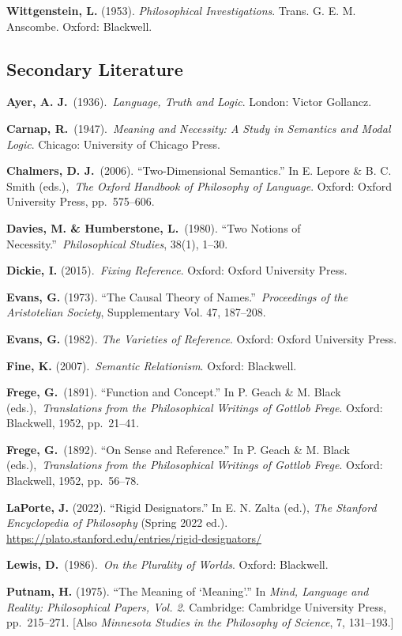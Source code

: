 \documentclass[12pt,a4paper]{article}
\begin{document}
\textbf{Wittgenstein, L.} (1953). \emph{Philosophical Investigations}. Trans. G. E. M. Anscombe. Oxford: Blackwell.

\subsection{Secondary Literature}\label{secondary-literature}

\textbf{Ayer, A. J.}~(1936).~\emph{Language, Truth and Logic}. London: Victor Gollancz.

\textbf{Carnap, R.}~(1947).~\emph{Meaning and Necessity: A Study in Semantics and Modal Logic}. Chicago: University of Chicago Press.

\textbf{Chalmers, D. J.}~(2006). ``Two-Dimensional Semantics.'' In E. Lepore \& B. C. Smith (eds.),~\emph{The Oxford Handbook of Philosophy of Language}. Oxford: Oxford University Press, pp.~575--606.

\textbf{Davies, M. \& Humberstone, L.}~(1980). ``Two Notions of Necessity.''~\emph{Philosophical Studies}, 38(1), 1--30.

\textbf{Dickie, I.} (2015).~\emph{Fixing Reference}. Oxford: Oxford University Press.

\textbf{Evans, G.} (1973). ``The Causal Theory of Names.''~\emph{Proceedings of the Aristotelian Society}, Supplementary Vol. 47, 187--208.

\textbf{Evans, G.} (1982). \emph{The Varieties of Reference}. Oxford: Oxford University Press.

\textbf{Fine, K.} (2007).~\emph{Semantic Relationism}. Oxford: Blackwell.

\textbf{Frege, G.}~(1891). ``Function and Concept.'' In P. Geach \& M. Black (eds.),~\emph{Translations from the Philosophical Writings of Gottlob Frege}. Oxford: Blackwell, 1952, pp.~21--41.

\textbf{Frege, G.}~(1892). ``On Sense and Reference.'' In P. Geach \& M. Black (eds.),~\emph{Translations from the Philosophical Writings of Gottlob Frege}. Oxford: Blackwell, 1952, pp.~56--78.

\textbf{LaPorte, J.} (2022). ``Rigid Designators.'' In E. N. Zalta (ed.), \emph{The Stanford Encyclopedia of Philosophy} (Spring 2022 ed.). \url{https://plato.stanford.edu/entries/rigid-designators/}

\textbf{Lewis, D.}~(1986).~\emph{On the Plurality of Worlds}. Oxford: Blackwell.

\textbf{Putnam, H.} (1975). ``The Meaning of `Meaning'.'' In \emph{Mind, Language and Reality: Philosophical Papers, Vol. 2}. Cambridge: Cambridge University Press, pp.~215--271. {[}Also \emph{Minnesota Studies in the Philosophy of Science}, 7, 131--193.{]}
\end{document}
